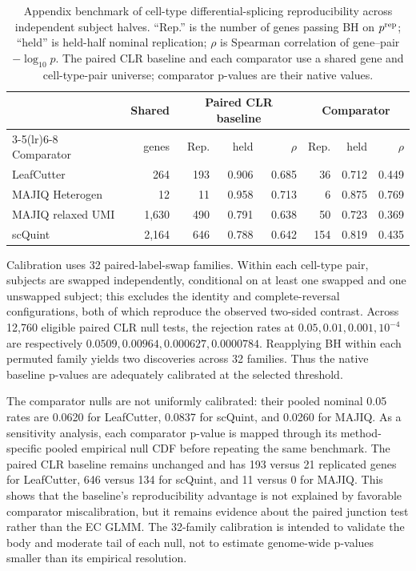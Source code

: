 \documentclass[11pt]{article}
\begin{document}
\begin{table}[H]
\centering
\scriptsize
\caption{Appendix benchmark of cell-type differential-splicing reproducibility across independent subject halves. ``Rep.'' is the number of genes passing BH on \(p^{\rm rep}\); ``held'' is held-half nominal replication; \(\rho\) is Spearman correlation of gene--pair \(-\log_{10}p\). The paired CLR baseline and each comparator use a shared gene and cell-type-pair universe; comparator p-values are their native values.}
\label{tab:paired-reproducibility}
\begin{tabular}{lrrrrrrr}
\toprule
& Shared & \multicolumn{3}{c}{Paired CLR baseline} & \multicolumn{3}{c}{Comparator}\\
\cmidrule(lr){3-5}\cmidrule(lr){6-8}
Comparator & genes & Rep. & held & \(\rho\) & Rep. & held & \(\rho\)\\
\midrule
LeafCutter & 264 & 193 & 0.906 & 0.685 & 36 & 0.712 & 0.449\\
MAJIQ Heterogen & 12 & 11 & 0.958 & 0.713 & 6 & 0.875 & 0.769\\
MAJIQ relaxed UMI & 1,630 & 490 & 0.791 & 0.638 & 50 & 0.723 & 0.369\\
scQuint & 2,164 & 646 & 0.788 & 0.642 & 154 & 0.819 & 0.435\\
\bottomrule
\end{tabular}
\end{table}

Calibration uses 32 paired-label-swap families. Within each cell-type pair, subjects are swapped independently, conditional on at least one swapped and one unswapped subject; this excludes the identity and complete-reversal configurations, both of which reproduce the observed two-sided contrast. Across 12,760 eligible paired CLR null tests, the rejection rates at \(0.05,0.01,0.001,10^{-4}\) are respectively \(0.0509,0.00964,0.000627,0.0000784\). Reapplying BH within each permuted family yields two discoveries across 32 families. Thus the native baseline p-values are adequately calibrated at the selected threshold.

The comparator nulls are not uniformly calibrated: their pooled nominal 0.05 rates are 0.0620 for LeafCutter, 0.0837 for scQuint, and 0.0260 for MAJIQ. As a sensitivity analysis, each comparator p-value is mapped through its method-specific pooled empirical null CDF before repeating the same benchmark. The paired CLR baseline remains unchanged and has 193 versus 21 replicated genes for LeafCutter, 646 versus 134 for scQuint, and 11 versus 0 for MAJIQ. This shows that the baseline's reproducibility advantage is not explained by favorable comparator miscalibration, but it remains evidence about the paired junction test rather than the EC GLMM. The 32-family calibration is intended to validate the body and moderate tail of each null, not to estimate genome-wide p-values smaller than its empirical resolution.
\end{document}
